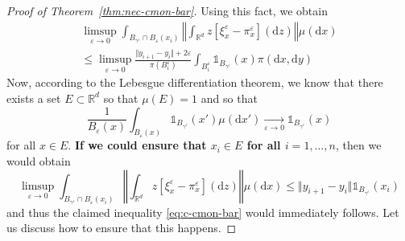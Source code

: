 \documentclass[leqno, 11pt, a4paper]{amsart}
\theoremstyle{definition}
\newcommand{\R}{\mathbb{R}}
\newcommand{\eps}{\varepsilon}
\newcommand{\dd}{\mathrm{d}}
\begin{document}
\begin{proof}[Proof of Theorem~\ref{thm:nec-cmon-bar}]
Using this fact, we obtain 
     \begin{multline}
         \limsup_{\eps \to 0}\int_{B_{\gamma^\eps} \cap B_\eps(x_i)} \left\Vert \int_{\R^d} z [\xi^\eps_x - \pi^\eps_x](\dd z) \right\Vert \mu(\dd x) \\\leq \limsup_{\eps \to 0} \frac{\Vert y_{i+1} - y_i\Vert + 2\eps}{\pi(B_i^\eps)} \int_{B_i^\eps} \mathds{1}_{B_{\gamma^{\overline{\eps}}}}(x) \pi(\dd x, \dd y)%
     \end{multline}
Now, according to the Lebesgue differentiation theorem, we know that  there exists a set $E \subset \R^d$ so that $\mu(E) = 1$ and so that 
     $$
     \frac1{B_\eps(x)} \int_{B_\eps(x)} \mathds{1}_{B_{\gamma^{\overline{\eps}}}}(x') \mu(\dd x') \xrightarrow[\eps \to 0]{} \mathds{1}_{B_{\gamma^{\overline{\eps}}}}(x)
     $$
     for all $x \in E$. \textbf{If we could ensure that $x_i \in E$ for all $i = 1, \dots,n$}, then we would obtain 
     $$
      \limsup_{\eps \to 0}\int_{B_{\gamma^\eps} \cap B_\eps(x_i)} \left\Vert \int_{\R^d} z [\xi^\eps_x - \pi^\eps_x](\dd z) \right\Vert \mu(\dd x) \leq \Vert y_{i+1} - y_i\Vert \mathds{1}_{B_{\gamma^{\overline{\eps}}}}(x_i) 
     $$
     and thus the claimed inequality \eqref{eq:c-cmon-bar} would immediately follows. Let us discuss how to ensure that this happens. 
     

\end{proof}
\end{document}
